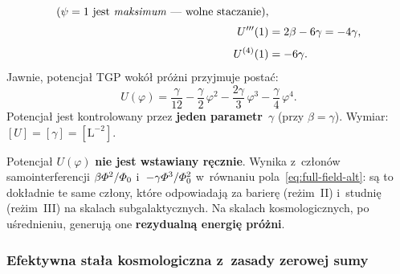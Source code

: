 \begin{definition}
\begin{align}
    \quad (\text{$\psi = 1$ jest \emph{maksimum} --- wolne staczanie}),
    \label{eq:meff-from-bg} \\[3pt]
  U'''(1) &= 2\beta - 6\gamma = -4\gamma,
    \label{eq:l3-from-bg} \\[3pt]
  U^{(4)}(1) &= -6\gamma.
    \label{eq:l4-from-bg}
\end{align}
Jawnie, potencja\l{} TGP wok\'o\l{} pr\'o\.zni przyjmuje posta\'c:
\begin{equation}\label{eq:U-phi-explicit}
  U(\varphi) = \frac{\gamma}{12}
  - \frac{\gamma}{2}\,\varphi^2
  - \frac{2\gamma}{3}\,\varphi^3
  - \frac{\gamma}{4}\,\varphi^4.
\end{equation}
Potencja\l{} jest kontrolowany przez \textbf{jeden parametr}~$\gamma$
(przy $\beta = \gamma$). Wymiar: $[U] = [\gamma] = [\mathrm{L}^{-2}]$.
\end{definition}

\begin{remark}
Potencja\l{} $U(\varphi)$ \textbf{nie jest wstawiany r\k{e}cznie}.
Wynika z~cz\l{}on\'ow samointerferencji $\beta\varPhi^2/\varPhi_0$
i~$-\gamma\varPhi^3/\varPhi_0^2$
w~r\'ownaniu pola~\eqref{eq:full-field-alt}: s\k{a} to dok\l{}adnie
te same cz\l{}ony, kt\'ore odpowiadaj\k{a} za barier\k{e} (re\.zim~II)
i~studni\k{e} (re\.zim~III) na skalach subgalaktycznych. Na skalach
kosmologicznych, po u\'srednieniu, generuj\k{a} one
\textbf{rezydualn\k{a} energi\k{e} pr\'o\.zni}.
\end{remark}

\subsubsection{Efektywna sta\l{}a kosmologiczna z~zasady zerowej sumy}

